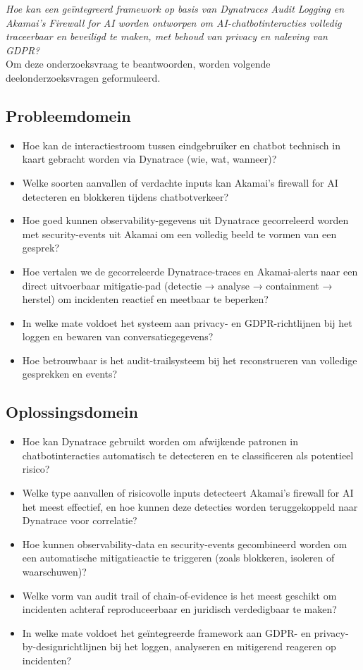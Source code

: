 \textit{Hoe kan een geïntegreerd framework op basis van Dynatraces Audit Logging en Akamai’s Firewall for AI worden ontworpen om AI-chatbotinteracties volledig traceerbaar en beveiligd te maken, met behoud van privacy en naleving van GDPR?}\\

Om deze onderzoeksvraag te beantwoorden, worden volgende deelonderzoeksvragen geformuleerd.

\subsection*{Probleemdomein}

\begin{itemize}
    \item Hoe kan de interactiestroom tussen eindgebruiker en chatbot technisch in kaart gebracht worden via Dynatrace (wie, wat, wanneer)?
    \item Welke soorten aanvallen of verdachte inputs kan Akamai’s firewall for AI detecteren en blokkeren tijdens chatbotverkeer? 
    \item Hoe goed kunnen observability-gegevens uit Dynatrace gecorreleerd worden met security-events uit Akamai om een volledig beeld te vormen van een gesprek?
    \item Hoe vertalen we de gecorreleerde Dynatrace-traces en Akamai-alerts naar een direct uitvoerbaar mitigatie-pad (detectie → analyse → containment → herstel) om incidenten reactief en meetbaar te beperken?
    \item In welke mate voldoet het systeem aan privacy- en GDPR-richtlijnen bij het loggen en bewaren van conversatiegegevens?
    \item Hoe betrouwbaar is het audit-trailsysteem bij het reconstrueren van volledige gesprekken en events?
\end{itemize}

\subsection*{Oplossingsdomein}

\begin{itemize}
    \item Hoe kan Dynatrace gebruikt worden om afwijkende patronen in chatbotinteracties automatisch te detecteren en te classificeren als potentieel risico?
    \item Welke type aanvallen of risicovolle inputs detecteert Akamai’s firewall for AI het meest effectief, en hoe kunnen deze detecties worden teruggekoppeld naar Dynatrace voor correlatie?
    \item Hoe kunnen observability-data en security-events gecombineerd worden om een automatische mitigatieactie te triggeren (zoals blokkeren, isoleren of waarschuwen)?
    \item Welke vorm van audit trail of chain-of-evidence is het meest geschikt om incidenten achteraf reproduceerbaar en juridisch verdedigbaar te maken?
    \item In welke mate voldoet het geïntegreerde framework aan GDPR- en privacy-by-designrichtlijnen bij het loggen, analyseren en mitigerend reageren op incidenten?
\end{itemize}

